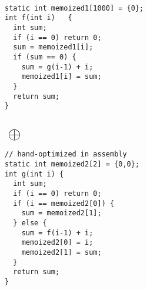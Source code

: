 \begin{figure}[t]
\hspace*{-1.9mm}
\begin{minipage}{0.423\textwidth}
\begin{Verbatim}[frame=single]

static int memoized1[1000] = {0};
int f(int i)   {
  int sum;
  if (i == 0) return 0;
  sum = memoized1[i];
  if (sum == 0) {
    sum = g(i-1) + i;
    memoized1[i] = sum;
  }
  return sum;  
}


\end{Verbatim}
\end{minipage}
\hspace*{-2.0mm}
$\mbox{}~\mathlarger{\mathlarger{\mathlarger{\mathlarger{\mathlarger{\llink}}}}}~\mbox{}$
\hspace*{-2.2mm}
\hspace*{-1.9mm}
\begin{minipage}{0.41\textwidth}
\begin{Verbatim}[frame=single]
// hand-optimized in assembly
static int memoized2[2] = {0,0};
int g(int i) {
  int sum;
  if (i == 0) return 0;
  if (i == memoized2[0]) {
    sum = memoized2[1];
  } else {
    sum = f(i-1) + i;
    memoized2[0] = i;
    memoized2[1] = sum;
  }
  return sum;
}
\end{Verbatim}
\end{minipage}
\\
\mbox{
\hspace*{-1.9mm}
}
\end{figure}
